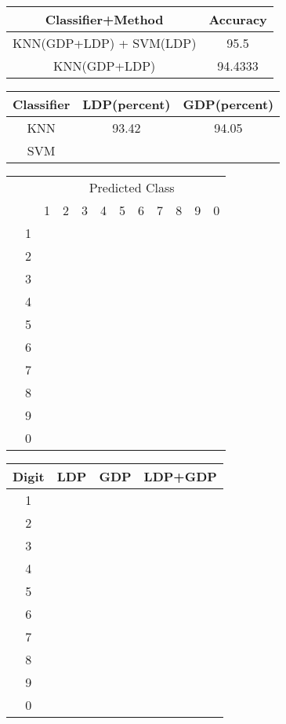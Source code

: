\documentclass{article}
\begin{document}
	\begin{center}
		\begin{tabular}{cc}
			\hline
			Classifier+Method & Accuracy \\
			\hline
			KNN(GDP+LDP) + SVM(LDP) & 95.5\\
			KNN(GDP+LDP) & 94.4333\\
			\hline
		\end{tabular}
	\end{center}

	\begin{center}
		\begin{tabular}{ccc}
			\hline
			Classifier & LDP(percent) & GDP(percent) \\
			\hline
			KNN & 93.42 & 94.05\\
			SVM \\
			\hline
		\end{tabular}
	\end{center}
	\begin{center}
		\begin{tabular}{|c|c|c|c|c|c|c|c|c|c|c|c|}
			\hline
			\multicolumn{2}{|c|}{} & \multicolumn{10}{c|}{Predicted Class}\\
			\cline{3-12}
			\multicolumn{2}{|c|}{} & 1 & 2 & 3 & 4 & 5 & 6 & 7 & 8 & 9 & 0\\
			\hline
			\parbox[t]{2mm}{}
			& 1 & & & & & & & & & &\\
			& 2 & & & & & & & & & &\\
			& 3 & & & & & & & & & &\\
			& 4 & & & & & & & & & &\\
			& 5 & & & & & & & & & &\\
			& 6 & & & & & & & & & &\\
			& 7 & & & & & & & & & &\\
			& 8 & & & & & & & & & &\\
			& 9 & & & & & & & & & &\\
			& 0 & & & & & & & & & &\\
			\hline
		\end{tabular}
	\end{center}
	\begin{center}
		\begin{tabular}{cccc}
			\hline
			Digit & LDP & GDP & LDP+GDP \\
			\hline
			1 \\
			2 \\
			3 \\
			4 \\
			5 \\
			6 \\
			7 \\
			8 \\
			9 \\
			0 \\
			\hline
		\end{tabular}
	\end{center}
	
\end{document}
